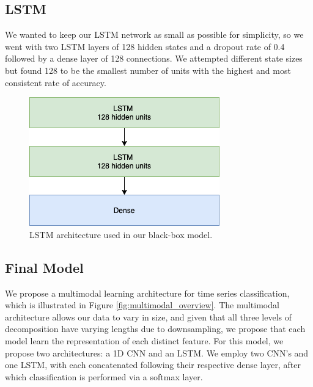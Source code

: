 \documentclass{turabian-thesis}[12pt]
\begin{document}
\subsection{LSTM}
We wanted to keep our LSTM network as small as possible for simplicity, so we went with two LSTM layers of 128 hidden states and a dropout rate of 0.4  followed by a dense layer of 128 connections. We attempted different state sizes but found 128 to be the smallest number of units with the highest and most consistent rate of accuracy.

\begin{figure}[h!]
   \begin{center}
      \includegraphics[scale=0.6]{../media/lstm_model.png}
   \end{center}
   \caption{LSTM architecture used in our black-box model.}
   \label{fig:lstm_model}
\end{figure}


\subsection{Final Model}

We propose a multimodal learning architecture for time series classification, which is illustrated in Figure \ref{fig:multimodal_overview}. The multimodal architecture allows our data to vary in size, and given that all three levels of decomposition have varying lengths due to downsampling, we propose that each model learn the representation of each distinct feature. For this model, we propose two architectures: a 1D CNN and an LSTM. We employ two CNN’s and one LSTM, with each concatenated following their respective dense layer, after which classification is performed via a softmax layer. 
\end{document}
